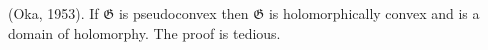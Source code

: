(Oka, 1953). If $\mathfrak{G}$ is pseudoconvex then $\mathfrak{G}$ is holomorphically convex and is a domain of holomorphy.
The proof is tedious.
